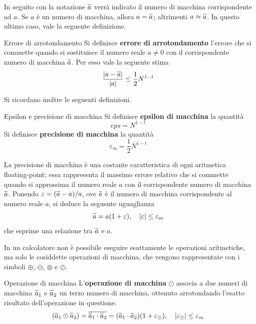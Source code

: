 In seguito con la notazione $\overline{a\vphantom{\rule{0pt}{1.2ex}}}$ verrà indicato il numero di
macchina corrispondente ad $a$. Se $a$ è un numero di macchina, allora
$a=\overline{a\vphantom{\rule{0pt}{1.2ex}}}$; altrimenti
$a\approx\overline{a\vphantom{\rule{0pt}{1.2ex}}}$. In questo ultimo caso, vale la seguente
definizione.
\begin{definition}{Errore di arrotondamento}
    Si definisce \textbf{errore di arrotondamento} l'errore che si commette quando si sostituisce
    il numero reale $a\ne0$ con il corrispondente numero di macchina $\overline{a\vphantom{\rule{0pt}{1.2ex}}}$.
    Per esso vale la seguente stima
    \[\frac{|a-\overline{a\vphantom{\rule{0pt}{1.2ex}}}|}{|a|}\leq\frac{1}{2}N^{1-t}\]
\end{definition}

Si ricordano inoltre le seguenti definizioni.
\begin{definition}{Epsilon e precisione di macchina}
    Si definisce \textbf{epsilon di macchina} la quantità
    \[eps=N^{1-t}\]
    Si definisce \textbf{precisione di macchina} la quantità
    \[\varepsilon_m=\frac12N^{1-t}\]
\end{definition}

La precisione di macchina è una costante caratteristica di ogni aritmetica floating-point; essa
rappresenta il massimo errore relativo che si commette quando si approssima il numero reale $a$ con
il corrispondente numero di macchina $\overline{a\vphantom{\rule{0pt}{1.2ex}}}$. Ponendo
$\varepsilon=(\overline{a\vphantom{\rule{0pt}{1.2ex}}}-a)/a$, ove $\overline{a\vphantom{\rule{0pt}{1.2ex}}}$
è il numero di macchina corrispondente al numero reale $a$, si deduce la seguente uguaglianza
\[\overline{a\vphantom{\rule{0pt}{1.2ex}}}=a(1+\varepsilon),\quad |\varepsilon|\leq\varepsilon_m\]
che esprime una relazione tra $\overline{a\vphantom{\rule{0pt}{1.2ex}}}$ e $a$.

In un calcolatore non è possibile eseguire esattamente le operazioni aritmetiche, ma solo le
cosiddette operazioni di macchina, che vengono rappresentate con i simboli $\oplus$, $\ominus$,
$\otimes$ e $\oslash$.
\begin{definition}{Operazione di macchina}
    L’\textbf{operazione di macchina} $\odot$ associa a due numeri di macchina
    $\overline{a\vphantom{\rule{0pt}{1.2ex}}}_1$ e $\overline{a\vphantom{\rule{0pt}{1.2ex}}}_2$ un
    terzo numero di macchina, ottenuto arrotondando l’esatto risultato dell’operazione in questione.
    \[(\overline{a\vphantom{\rule{0pt}{1.2ex}}}_1\odot\overline{a\vphantom{\rule{0pt}{1.2ex}}}_2)=
    \overline{\overline{a\vphantom{\rule{0pt}{1.2ex}}}_1\cdot\overline{a\vphantom{\rule{0pt}{1.2ex}}}_2}
    =(\overline{a\vphantom{\rule{0pt}{1.2ex}}}_1\cdot\overline{a\vphantom{\rule{0pt}{1.2ex}}}_2)
    (1+\varepsilon_\odot),\quad|\varepsilon_\odot|\leq\varepsilon_m\]
\end{definition}


